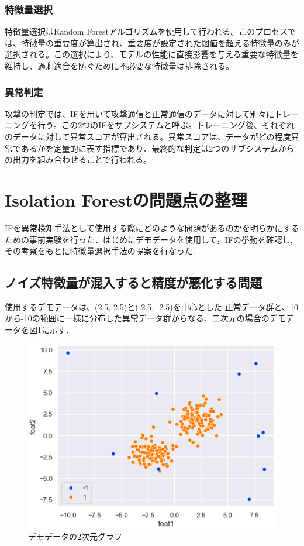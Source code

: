 \documentclass{css}
\begin{document}
\subsubsection{特徴量選択}

特徴量選択はRandom Forestアルゴリズムを使用して行われる。このプロセスでは、特徴量の重要度が算出され、重要度が設定された閾値を超える特徴量のみが選択される。この選択により、モデルの性能に直接影響を与える重要な特徴量を維持し、過剰適合を防ぐために不必要な特徴量は排除される。

\subsubsection{異常判定}

攻撃の判定では、IFを用いて攻撃通信と正常通信のデータに対して別々にトレーニングを行う。この2つのIFをサブシステムと呼ぶ。トレーニング後、それぞれのデータに対して異常スコアが算出される。異常スコアは、データがどの程度異常であるかを定量的に表す指標であり、最終的な判定は2つのサブシステムからの出力を組み合わせることで行われる。


\section{Isolation Forestの問題点の整理}
IFを異常検知手法として使用する際にどのような問題があるのかを明らかにするための事前実験を行った．はじめにデモデータを使用して，IFの挙動を確認し,その考察をもとに特徴量選択手法の提案を行なった.

\subsection{ノイズ特徴量が混入すると精度が悪化する問題}
使用するデモデータは、(2.5, 2.5)と(-2.5, -2.5)を中心とした
正常データ群と、10から-10の範囲に一様に分布した異常データ群からなる．二次元の場合のデモデータを図\ref{fig:demodata}に示す．

\begin{figure}[ht]
    \centering
    \includegraphics[width=\linewidth]{pictures/eps/demodata.eps}
    \caption{デモデータの2次元グラフ}
    \label{fig:demodata}
\end{figure}
\end{document}
